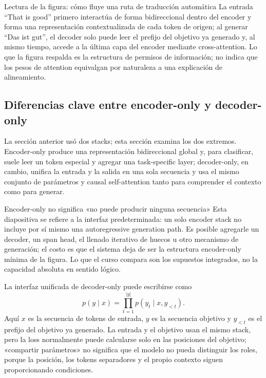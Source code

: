 \begin{knowledgebox}{Lectura de la figura: cómo fluye una ruta de traducción automática}
La entrada ``That is good'' primero interactúa de forma bidireccional dentro del encoder y forma una representación contextualizada de cada token de origen; al generar ``Das ist gut'', el decoder solo puede leer el prefijo del objetivo ya generado y, al mismo tiempo, accede a la última capa del encoder mediante cross-attention. Lo que la figura respalda es la estructura de permisos de información; no indica que los pesos de attention equivalgan por naturaleza a una explicación de alineamiento.
\end{knowledgebox}

\subsection{Diferencias clave entre encoder-only y decoder-only}

La sección anterior usó dos stacks; esta sección examina los dos extremos. Encoder-only produce una representación bidireccional global y, para clasificar, suele leer un token especial y agregar una task-specific layer; decoder-only, en cambio, unifica la entrada y la salida en una sola secuencia y usa el mismo conjunto de parámetros y causal self-attention tanto para comprender el contexto como para generar.


\begin{warningbox}{Encoder-only no significa «no puede producir ninguna secuencia»}
Esta diapositiva se refiere a la interfaz predeterminada: un solo encoder stack no incluye por sí mismo una autoregressive generation path. Es posible agregarle un decoder, un span head, el llenado iterativo de huecos u otro mecanismo de generación; el costo es que el sistema deja de ser la estructura encoder-only mínima de la figura. Lo que el curso compara son los supuestos integrados, no la capacidad absoluta en sentido lógico.
\end{warningbox}


La interfaz unificada de decoder-only puede escribirse como
\[
p(y\mid x)=\prod_{t=1}^{|y|}p(y_t\mid x,y_{<t}).
\]
Aquí $x$ es la secuencia de tokens de entrada, $y$ es la secuencia objetivo y $y_{<t}$ es el prefijo del objetivo ya generado. La entrada y el objetivo usan el mismo stack, pero la loss normalmente puede calcularse solo en las posiciones del objetivo; «compartir parámetros» no significa que el modelo no pueda distinguir los roles, porque la posición, los tokens separadores y el propio contexto siguen proporcionando condiciones.

